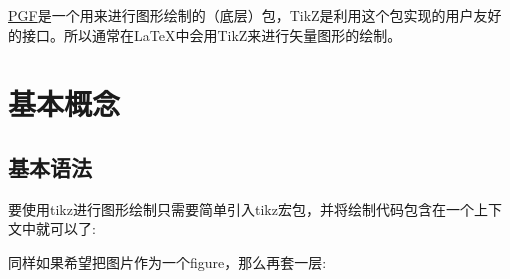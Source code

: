 \documentclass[12pt]{article}
\begin{document}
\makeblogtitle

\href{https://www.ctan.org/pkg/pgf}{PGF}是一个用来进行图形绘制的（底层）包，TikZ是利用这个包实现的用户友好的接口。所以通常在LaTeX中会用TikZ来进行矢量图形的绘制。

\section{基本概念}\label{ux57faux672cux6982ux5ff5}

\subsection{基本语法}\label{ux57faux672cux8bedux6cd5}

要使用tikz进行图形绘制只需要简单引入tikz宏包，并将绘制代码包含在一个上下文中就可以了:

\begin{Shaded}
\begin{Highlighting}[]
\NormalTok{\{}\NormalTok{\}}

\NormalTok{\{}\NormalTok{\}}
\NormalTok{\{}\NormalTok{\}}
\end{Highlighting}
\end{Shaded}

同样如果希望把图片作为一个figure，那么再套一层:

\begin{Shaded}
\begin{Highlighting}[]
\NormalTok{\{}\NormalTok{\}}
\NormalTok{\{}\NormalTok{\}}

\NormalTok{\{}\NormalTok{\}}
    \NormalTok{\{}\NormalTok{\}[h]}
    \NormalTok{\{}\NormalTok{\}}
    \NormalTok{\{}\NormalTok{\}}
    \NormalTok{\{}\NormalTok{\}}
\NormalTok{\{}\NormalTok{\}}
\end{Highlighting}
\end{Shaded}
\end{document}
